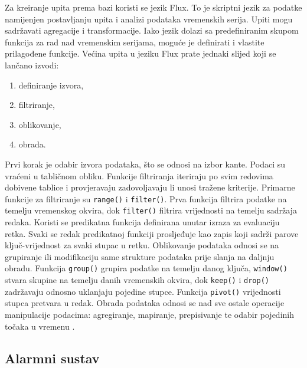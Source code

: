 Za kreiranje upita prema bazi koristi se jezik Flux. To je skriptni jezik za podatke  namijenjen postavljanju upita i analizi podataka vremenskih serija. Upiti mogu sadržavati agregacije i transformacije. Iako jezik dolazi sa predefiniranim skupom funkcija za rad nad vremenskim serijama, moguće je definirati i vlastite prilagođene funkcije. Većina upita u jeziku Flux prate jednaki slijed koji se lančano izvodi:
\begin{enumerate}
	\item definiranje izvora,
	\item filtriranje,
	\item oblikovanje,
	\item obrada. 
\end{enumerate}

Prvi korak je odabir izvora podataka, što se odnosi na izbor kante. Podaci su vraćeni u tabličnom obliku. Funkcije filtriranja iteriraju po svim redovima dobivene tablice i provjeravaju zadovoljavaju li unosi tražene kriterije. Primarne funkcije za filtriranje su \lstinline|range()| i \lstinline|filter()|. Prva funkcija filtrira podatke na temelju vremenskog okvira, dok \lstinline|filter()| filtrira vrijednosti na temelju sadržaja redaka. Koristi se predikatna funkcija definirana unutar izraza za evaluaciju retka. Svaki se redak predikatnoj funkciji prosljeđuje kao zapis koji sadrži parove ključ-vrijednost za svaki stupac u retku. Oblikovanje podataka odnosi se na grupiranje ili modifikaciju same strukture podataka prije slanja na daljnju obradu. Funkcija \lstinline|group()| grupira podatke na temelju danog ključa, \lstinline|window()| stvara skupine na temelju danih vremenskih okvira, dok \lstinline|keep()| i \lstinline|drop()| zadržavaju odnosno uklanjaju pojedine stupce. Funkcija \lstinline|pivot()| vrijednosti stupca pretvara u redak. Obrada podataka odnosi se nad sve ostale operacije manipulacije podacima: agregiranje, mapiranje, prepisivanje te odabir pojedinih točaka u vremenu \cite{influxdb}. 

\subsection{Alarmni sustav}

